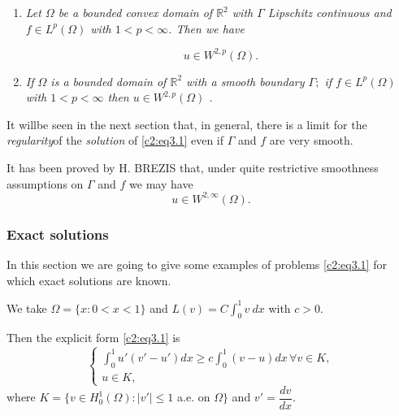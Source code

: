\begin{enumerate}[(1)]
\item \textit{Let $\Omega$ be a bounded convex domain of
  $\mathbb{R}^2$ with $\Gamma$ Lipschitz continuous and $f \in L^p
  (\Omega)$ with $1< p < \infty$. Then we have}  
 
\begin{equation}
u \in W^{2, p} (\Omega). \tag{3.13}\label{c2eq3.13}
\end{equation}  
\item  \textit{If $\Omega$ is a bounded domain of $\mathbb{R}^2$ with
a smooth boundary $\Gamma ;$ if $f \in  L^p(\Omega)$ with $1 <
p < \infty $ then $u \in W^{2, p}(\Omega)$ .} 
\end{enumerate}  

\begin{remark}\label{c2:rem3.4}%
It will\pageoriginale  be seen in the next section that, in general, there is a limit
for the {\em regularity}of the {\em solution} of \eqref{c2:eq3.1} even if
$\Gamma$ and $f$ are very smooth. 
\end{remark}

\begin{remark}\label{c2:rem3.5}%
It has been proved by H. BREZIS that, under quite restrictive
smoothness assumptions on $\Gamma$ and $f$ we may have  
$$
u \in W^{2, \infty}(\Omega).
$$
\end{remark}

\subsubsection{Exact solutions}\label{c2:sss3.3.2}%

 In this section we are going to give some examples of problems \eqref{c2:eq3.1}
 for which exact solutions are known. 

\begin{example}\label{c2:ex1}%
We take $\Omega = \{x : 0 < x < 1 \}$ and $L (v) = C \int^1_0 v ~ dx $
with $c > 0$. 

Then the explicit form \eqref{c2:eq3.1} is 
\begin{equation}
\begin{cases}
\int^1_0 u' (v' - u') dx \geq c \int^1_0 (v - u) dx\, \forall  v \in K,\\
u \in K,\tag{3.14}\label{c2:eq3.14}
\end{cases}
\end{equation}
where $K = \{v \in H^1_0 (\Omega) : | v'| \leq 1$ a.e. on $\Omega
\}$ and $v' = \dfrac{dv}{dx}$.  
\end{example}

